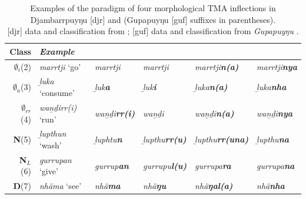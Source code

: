 \begin{table}[h]
	\caption[Western Dhuwal(a) conjugation classes]{Examples of the paradigm of four morphological TMA inflections in Djambarrpuyŋu [\gls{djr}] and (Gupapuyŋu [\gls{guf}] suffixes in parentheses).\\{}[\gls{djr}] data and classification from \citet{Wilkinson1991}; [\gls{guf}] data and classification from \textit{Gupapuyŋu} \citeyearpar{Lowe1996}.} \label{djr-pdm-exx}
	\centering
	\begin{tabular}{rl|>{\it}l>{\it}l>{\it}l>{\it}l}
		\textbf{Class} & \textbf{\textit{Example}} & \textup{\I} & \textup{\II} & \textup{\III} & \textup{\IV}\\\midrule
		$\boldsymbol\emptyset_{i}$\hfill(2)& \textit{marrtji} `go' & \textit{marrtji}& \textit{marrtji} & \textit{marrtji\textbf{n(a)}} & \textit{marrtji\textbf{nya}}\\
		
		$ \boldsymbol\emptyset_{\textit{a}} $\hfill (3) & \textit{ḻuka} `consume' & \textit{ḻuk\textbf{a}} & \textit{ḻuk\textbf{i}} & ḻuka\textbf{n(a)} & ḻuka\textbf{nha}\\

		$\boldsymbol\emptyset_{\textit{rr}}$ \hfill (4)& \textit{waṉḏirr(i)} `run' & \textit{waṉḏi\textbf{rr(i)}}& \textit{waṉḏi} & \textit{waṉḏi\textbf{n(a)}} & \textit{waṉḏi\textbf{nya}}\\
		
		
		
		\textbf{N}\hfill(5)& \textit{ḻupthun} `wash' &\textit{ḻuphtu\textbf{n}} & \textit{ḻupthu\textbf{rr(u)}} & \textit{ḻupthu\textbf{rr(una)}} & \textit{ḻupthu\textbf{na}}\\
		
		\textbf{N$ _{L} $}\hfill(6)& \textit{gurrupan} `give' & \textit{gurrup\textbf{an}} & gurrupu\textbf{l(u)}&gurrupa\textbf{ra}& gurrupa\textbf{na} \\
		
		\textbf{Ŋ}\hfill(7)& \textit{nhäma} `see' & \textit{nhä\textbf{ma}} & \textit{nhä\textbf{ŋu}} & \textit{nhä\textbf{ŋal(a)}} & \textit{nhä\textbf{nha}}\\\bottomrule
	\end{tabular}
	
\end{table}


